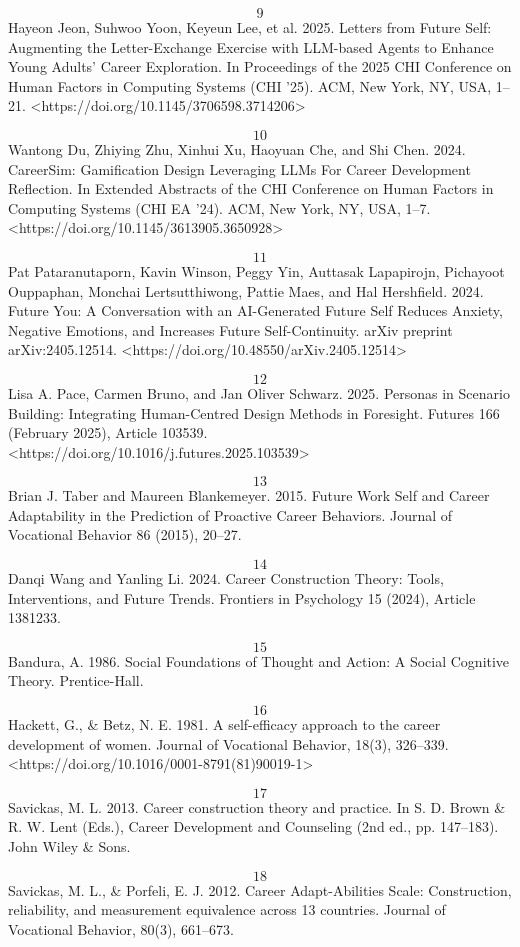 \textbf{\[9\]} Hayeon Jeon, Suhwoo Yoon, Keyeun Lee, et al. 2025. Letters from Future Self: Augmenting the Letter-Exchange Exercise with LLM-based Agents to Enhance Young Adults' Career Exploration. In Proceedings of the 2025 CHI Conference on Human Factors in Computing Systems (CHI '25). ACM, New York, NY, USA, 1--21. <https://doi.org/10.1145/3706598.3714206>

\textbf{\[10\]} Wantong Du, Zhiying Zhu, Xinhui Xu, Haoyuan Che, and Shi Chen. 2024. CareerSim: Gamification Design Leveraging LLMs For Career Development Reflection. In Extended Abstracts of the CHI Conference on Human Factors in Computing Systems (CHI EA '24). ACM, New York, NY, USA, 1--7. <https://doi.org/10.1145/3613905.3650928>

\textbf{\[11\]} Pat Pataranutaporn, Kavin Winson, Peggy Yin, Auttasak Lapapirojn, Pichayoot Ouppaphan, Monchai Lertsutthiwong, Pattie Maes, and Hal Hershfield. 2024. Future You: A Conversation with an AI-Generated Future Self Reduces Anxiety, Negative Emotions, and Increases Future Self-Continuity. arXiv preprint arXiv:2405.12514. <https://doi.org/10.48550/arXiv.2405.12514>

\textbf{\[12\]} Lisa A. Pace, Carmen Bruno, and Jan Oliver Schwarz. 2025. Personas in Scenario Building: Integrating Human-Centred Design Methods in Foresight. Futures 166 (February 2025), Article 103539. <https://doi.org/10.1016/j.futures.2025.103539>

\textbf{\[13\]} Brian J. Taber and Maureen Blankemeyer. 2015. Future Work Self and Career Adaptability in the Prediction of Proactive Career Behaviors. Journal of Vocational Behavior 86 (2015), 20--27.

\textbf{\[14\]} Danqi Wang and Yanling Li. 2024. Career Construction Theory: Tools, Interventions, and Future Trends. Frontiers in Psychology 15 (2024), Article 1381233.

\textbf{\[15\]} Bandura, A. 1986. Social Foundations of Thought and Action: A Social Cognitive Theory. Prentice-Hall.

\textbf{\[16\]} Hackett, G., \& Betz, N. E. 1981. A self-efficacy approach to the career development of women. Journal of Vocational Behavior, 18(3), 326--339. <https://doi.org/10.1016/0001-8791(81)90019-1>

\textbf{\[17\]} Savickas, M. L. 2013. Career construction theory and practice. In S. D. Brown \& R. W. Lent (Eds.), Career Development and Counseling (2nd ed., pp. 147--183). John Wiley \& Sons.

\textbf{\[18\]} Savickas, M. L., \& Porfeli, E. J. 2012. Career Adapt-Abilities Scale: Construction, reliability, and measurement equivalence across 13 countries. Journal of Vocational Behavior, 80(3), 661--673.

